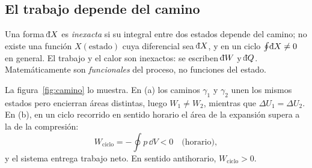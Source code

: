 \subsection{El trabajo depende del camino}

\begin{definicion}
Una forma $\dbar X$ es \emph{inexacta} si su integral entre dos estados depende del camino; no existe una
función $X(\text{estado})$ cuya diferencial sea $\dbar X$, y en un ciclo $\oint\dbar X\neq0$ en general. El
trabajo y el calor son inexactos: se escriben $\dbar W$ y $\dbar Q$. Matemáticamente son
\emph{funcionales} del proceso, no funciones del estado.
\end{definicion}

La figura~\ref{fig:camino} lo muestra. En (a) los caminos $\gamma_1$ y $\gamma_2$ unen los mismos estados
pero encierran áreas distintas, luego $W_1\neq W_2$, mientras que $\Delta U_1=\Delta U_2$. En (b), en un
ciclo recorrido en sentido horario el área de la expansión supera a la de la compresión:
\begin{equation}\label{eq:Wciclo}
  W_{\mathrm{ciclo}}=-\oint p\,\dd V<0\quad\text{(horario)},
\end{equation}
y el sistema entrega trabajo neto. En sentido antihorario, $W_{\mathrm{ciclo}}>0$.

